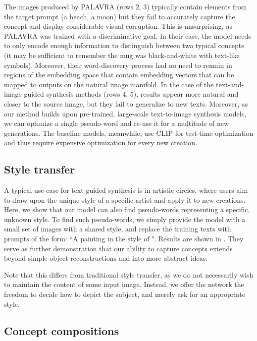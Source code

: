 The images produced by PALAVRA (rows $2$, $3$) typically contain elements from the target prompt (\eg a beach, a moon) but they fail to accurately capture the concept and display considerable visual corruption. This is unsurprising, as PALAVRA was trained with a discriminative goal. In their case, the model needs to only encode enough information to distinguish between two typical concepts (\eg it may be sufficient to remember the mug was black-and-white with text-like symbols). Moreover, their word-discovery process had no need to remain in regions of the embedding space that contain embedding vectors that can be mapped to outputs on the natural image manifold. In the case of the text-and-image guided synthesis methods (rows $4$, $5$), results appear more natural and closer to the source image, but they fail to generalize to new texts. Moreover, as our method builds upon pre-trained, large-scale text-to-image synthesis models, we can optimize a single pseudo-word and re-use it for a multitude of new generations. The baseline models, meanwhile, use CLIP for test-time optimization and thus require expensive optimization for every new creation.


\subsection{Style transfer}

A typical use-case for text-guided synthesis is in artistic circles, where users aim to draw upon the unique style of a specific artist and apply it to new creations. Here, we show that our model can also find pseudo-words representing a specific, unknown style. To find such pseudo-words, we simply provide the model with a small set of images with a shared style, and replace the training texts with prompts of the form: ``A painting in the style of \pholdercolor". Results are shown in . They serve as further demonstration that our ability to capture concepts extends beyond simple object reconstructions and into more abstract ideas.

Note that this differs from traditional style transfer, as we do not necessarily wish to maintain the content of some input image. Instead, we offer the network the freedom to decide how to depict the subject, and merely ask for an appropriate style.



\subsection{Concept compositions}


